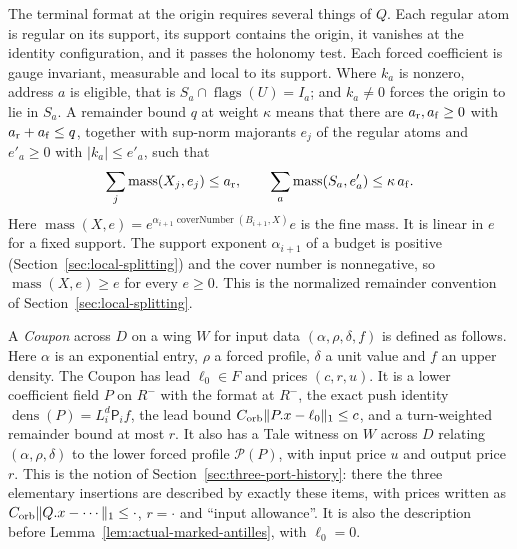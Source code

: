 The terminal format at the origin requires several things of $Q$. Each
regular atom is regular on its support, its support contains the
origin, it vanishes at the identity configuration, and it passes the
holonomy test. Each forced coefficient is gauge invariant, measurable
and local to its support. Where $k_a$ is nonzero, address $a$ is
eligible, that is $S_a\cap\operatorname{flags}(U)=I_a$; and $k_a\ne0$
forces the origin to lie in $S_a$. A remainder bound $q$ at weight
$\kappa$ means that there are $a_{\rm r},a_{\rm f}\ge0$ with
$a_{\rm r}+a_{\rm f}\le q$, together with sup-norm majorants $e_j$ of
the regular atoms and $e'_a\ge0$ with $|k_a|\le e'_a$, such that
\[
 \sum_j\operatorname{mass}(X_j,e_j)\le a_{\rm r},\qquad
 \sum_a\operatorname{mass}(S_a,e'_a)\le\kappa\,a_{\rm f}.
\]
Here $\operatorname{mass}(X,e)=e^{\alpha_{i+1}\operatorname{coverNumber}(B_{i+1},X)}e$
is the fine mass. It is linear in $e$ for a fixed support. The support
exponent $\alpha_{i+1}$ of a budget is positive
(Section~\ref{sec:local-splitting}) and the cover number is
nonnegative, so $\operatorname{mass}(X,e)\ge e$ for every $e\ge0$. This
is the normalized remainder convention of
Section~\ref{sec:local-splitting}.

A \emph{Coupon} across $D$ on a wing $W$ for input data
$(\alpha,\rho,\delta,f)$ is defined as follows. Here $\alpha$ is an
exponential entry, $\rho$ a forced profile, $\delta$ a unit value and
$f$ an upper density. The Coupon has lead $\ell_0\in F$ and prices
$(c,r,u)$. It is a lower coefficient field $P$ on $R^-$ with the
format at $R^-$, the exact push identity
$\operatorname{dens}(P)=L_i^d\mathsf P_if$, the lead bound
$C_{\rm orb}\|P.x-\ell_0\|_1\le c$, and a turn-weighted remainder
bound at most $r$. It also has a Tale witness on $W$ across $D$
relating $(\alpha,\rho,\delta)$ to the lower forced profile
$\mathcal P(P)$, with input price $u$ and output price $r$. This is the
notion of Section~\ref{sec:three-port-history}: there the three
elementary insertions are described by exactly these items, with
prices written as $C_{\rm orb}\|Q.x-\cdots\|_1\le\cdot$,
$r=\cdot$ and ``input allowance''. It is also the description before
Lemma~\ref{lem:actual-marked-antilles}, with $\ell_0=0$.

